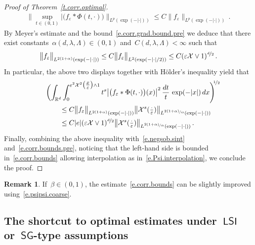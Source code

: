 \documentclass[11pt,twoside]{article} %
\numberwithin{equation}{section}
\theoremstyle{definition}
\newtheorem{remark}[theorem]{Remark}
\newcommand*{\R}{\ensuremath{\mathbb{R}}}
\newcommand{\eps}{\varepsilon}
\newcommand{\ep}{\eps}
\newcommand{\X}{\mathcal{X}}
\newcommand{\LSI}{\mathsf{LSI}}
\newcommand{\SG}{\mathsf{SG}}
\begin{document}
\begin{proof}[Proof of Theorem~\ref{t.corr.optimal}]
\begin{align*}  
\Big\| \sup_{t \in (0,1)}  \big| \bigl( f_\ep \ast \Phi(t,\cdot) \bigr) \Big\|_{L^p(\exp(-|\cdot|))} 
\leq 
C \big\| f_\ep \big\|_{L^p(\exp(-|\cdot|))} 
\,.
\end{align*}
By Meyer's estimate and the bound~\eqref{e.corr.grad.bound.pre} we deduce that there exist constants~$\alpha(d,\lambda,\Lambda) \in (0,1)$ and~$C(d,\lambda,\Lambda)<\infty$ such that 
\begin{align*}  
\big\| f_\ep \big\|_{L^{2(1+\alpha)}(\exp(-|\cdot|))} 
\leq 
C \big\| f_\ep \big\|_{L^2(\exp(-|\cdot|/2))}  
\leq
C  ( \ep\X \vee 1 )^{\nicefrac d2} 
\,.
\end{align*}
In particular, the above two displays together with H\"older's inequality yield that
\begin{align} \notag  
\lefteqn{
\biggl(  \int_{\R^d} \int_{0}^{\ep^2 \X^2\bigl(\tfrac x\ep\bigr) \wedge 1} t^s   \big| \bigl( f_\ep  \ast \Phi(t,\cdot) \bigr) (x) \big|^2 \, \frac{dt}{t} \, \exp(-|x|) \, dx 
\Biggr)^{\!\!\nicefrac12} 
} \qquad &
\\ 
\notag &
\leq 
C \big\| f_\ep \big\|_{L^{2(1+\alpha)}(\exp(-|\cdot|))} 
\big\| \X^s(\tfrac \cdot\ep) \big\|_{L^{\nicefrac{2(1{+}\alpha)}{\alpha} } (\exp(-|\cdot|)) }
\\ 
\notag &
\leq 
C|e| ( \ep\X \vee 1 )^{\nicefrac d2} 
\big\| \X^s(\tfrac \cdot\ep) \big\|_{L^{\nicefrac{2(1{+}\alpha)}{\alpha} } (\exp(-|\cdot|)) }
\,.
\end{align}
Finally, combining the above inequality with~\eqref{e.negsob.sint} and~\eqref{e.corr.bounds.pre}, noticing that the left-hand side is bounded in~\eqref{e.corr.bounds} allowing interpolation as in~\eqref{e.Psi.interpolation}, we conclude the proof. 
\end{proof}

\begin{remark}
If~$\beta \in (0,1)$, the estimate~\eqref{e.corr.bounds} can be slightly improved using~\eqref{e.psipsi.coarse}. 
\end{remark}



\subsection{The shortcut to optimal estimates under~\texorpdfstring{$\LSI$}{{LSI}} or~\texorpdfstring{$\SG$}{{SG}}-type assumptions}
\label{s.LSI}
\end{document}
